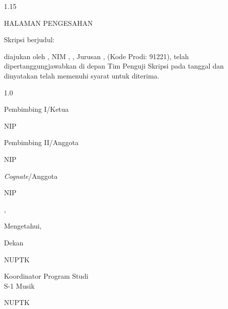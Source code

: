 \newcommand{\signatory}[4]{%
  \begin{minipage}[t]{#1}
    \raggedright
    #2\par
    \vspace{1.4cm}
    \textbf{\expandafter\uline\expandafter{#3}}\par
    #4
  \end{minipage}%
}
\newcommand{\examinercolumn}[3]{%
  \par\noindent\hspace{0.25\textwidth}%
  \signatory{0.75\textwidth}{#1}{#2}{#3}\par
  \vspace{0.3cm}%
}
\newpage
{}
{}
\begin{spacing}{1.15}
\begin{center}
    HALAMAN PENGESAHAN\par
    \vspace{0.3cm}
\end{center}
\noindent Skripsi berjudul:\par
\begin{center}
    \textbf{\thesistitle}\par
\end{center}
\noindent diajukan oleh \researchername{}, NIM \researchernim, \programstudy, Jurusan \departmentname, \facultyname{} \institutionname{} (Kode Prodi: 91221), telah dipertanggungjawabkan di depan Tim Penguji Skripsi pada tanggal \makebox[4cm]{\dotfill} dan dinyatakan telah memenuhi syarat untuk diterima.\par
\vspace{0.3cm}
\begin{spacing}{1.0}
\examinercolumn{Pembimbing I/Ketua}{\advisorone}{NIP \advisoronenip}
\examinercolumn{Pembimbing II/Anggota}{\advisortwo}{NIP \advisortwonip}
\examinercolumn{\textit{Cognate}/Anggota}{\cognate}{NIP \cognatenip}
\noindent\hspace{0.25\textwidth}\cityname, \makebox[4cm]{\dotfill}\par
\vspace{0.2cm}
\centerline{Mengetahui,}
\vspace{0.2cm}
\noindent
\signatory{0.57\textwidth}{Dekan \facultyname\\\institutionname}{\deanname}{NUPTK \deannuptk}%
\hfill
\signatory{0.4\textwidth}{Koordinator Program Studi\\S-1 Musik}{\programcoordinator}{NUPTK \programcoordinatornuptk}\par
\end{spacing}
\end{spacing}

